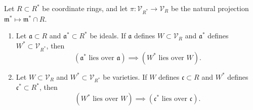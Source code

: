 Let $R \subset R^*$ be coordinate rings, and let $\pi : \mathcal{V}_{R^*} \to \mathcal{V}_R$ be the natural projection $\mathfrak{m}^* \mapsto \mathfrak{m}^* \cap R$.

\begin{enumerate}
\item[(10.8.1)] Let $\mathfrak{a} \subset R$ and $\mathfrak{a}^* \subset R^*$ be ideals. If $\mathfrak{a}$ defines $W \subset \mathcal{V}_R$ and $\mathfrak{a}^*$ defines $W^* \subset \mathcal{V}_{R^*}$, then
$$(\mathfrak{a}^* \text{ lies over } \mathfrak{a}) \implies (W^* \text{ lies over } W).$$

\item[(10.8.2)] Let $W \subset \mathcal{V}_R$ and $W^* \subset \mathcal{V}_{R^*}$ be varieties. If $W$ defines $\mathfrak{c} \subset R$ and $W^*$ defines $\mathfrak{c}^* \subset R^*$, then
$$(W^* \text{ lies over } W) \implies (\mathfrak{c}^* \text{ lies over } \mathfrak{c}).$$
\end{enumerate}
